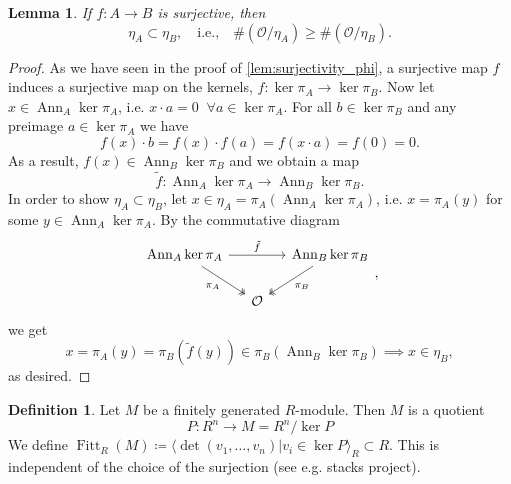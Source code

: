 \documentclass{article}
\theoremstyle{plain}%
\newtheorem{lemma}{Lemma}[section]
\theoremstyle{definition}
\newtheorem{definition}{Definition}[section]
\theoremstyle{remark}
\newcommand{\ann}{\operatorname{Ann}}
\newcommand{\fitt}{\operatorname{Fitt}}
\begin{document}
\begin{lemma}
    If \(f \colon A \to B\) is surjective, then
    \begin{equation}
        \eta_A \subset \eta_B, \quad \text{i.e.,}\quad \#(\mathcal{O}/\eta_A) \geq \#(\mathcal{O}/\eta_B).  
    \end{equation}
\end{lemma}
\begin{proof}
    As we have seen in the proof of \cref{lem:surjectivity_phi}, a surjective map \(f\) induces a surjective
    map on the kernels, \(f\colon \ker \pi_A \to \ker\pi_B\).
    Now let \(x \in \ann_A \ker \pi_A\), i.e. \(x \cdot a = 0\;\; \forall a \in \ker \pi_A\).
    For all \(b \in \ker \pi_B\) and any preimage \(a \in \ker \pi_A\) we have
    \[
        f(x) \cdot b = f(x) \cdot f(a) = f(x \cdot a) = f(0) = 0.
    \]
    As a result, \(f(x) \in \ann_B\ker \pi_B\) and we obtain a map
    \[
        \tilde f\colon\ann_A\ker \pi_A \to \ann_B \ker \pi_B.  
    \]
    In order to show \(\eta_A \subset \eta_B\), let \(x \in \eta_A = \pi_A(\ann_A \ker \pi_A)\), i.e.
    \(x = \pi_A(y)\) for some \(y \in \ann_A \ker \pi_A\). By the commutative diagram
    \[
    \begin{tikzcd}[column sep=small]
        \ann_A \ker \pi_A \arrow[rr, "\tilde f"] \arrow [dr, "\pi_A", swap, twoheadrightarrow] 
        & & \ann_B \ker \pi_B \arrow [dl, "\pi_B", twoheadrightarrow]\\
        & \mathcal{O} &
    \end{tikzcd},
    \]
    we get
    \[
        x = \pi_A(y) = \pi_B(\tilde f(y)) \in \pi_B(\ann_B \ker \pi_B) \implies x \in \eta_B,
    \]
    as desired.
\end{proof}

\begin{definition}
    Let \(M\) be a finitely generated \(R\)-module. Then \(M\) is a quotient
    \[
        P \colon R^n \longrightarrow M = R^n/\ker P
    \]
    We define \(\fitt_R(M) \coloneqq \langle \det(v_1, \dots, v_n) | v_i \in \ker P \rangle_R \subset R\).
    This is independent of the choice of the surjection (see e.g. stacks project).
\end{definition}
\end{document}
